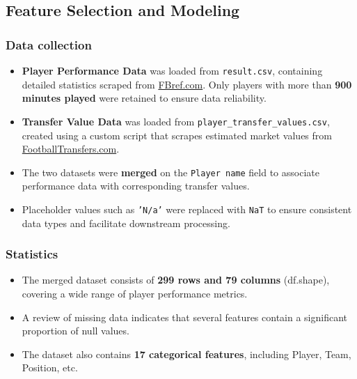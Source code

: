 \documentclass[12pt,a4paper]{report}
\begin{document}
\subsection{Feature Selection and Modeling}
\subsubsection{Data collection}
\begin{itemize}
    \item \textbf{Player Performance Data} was loaded from \texttt{result.csv}, containing detailed statistics scraped from \href{https://fbref.com/en/}{FBref.com}. Only players with more than \textbf{900 minutes played} were retained to ensure data reliability.
    \item \textbf{Transfer Value Data} was loaded from \texttt{player\_transfer\_values.csv}, created using a custom script that scrapes estimated market values from \href{https://footballtransfers.com}{FootballTransfers.com}.
    \item The two datasets were \textbf{merged} on the \texttt{Player name} field to associate performance data with corresponding transfer values.
    \item Placeholder values such as \texttt{'N/a'} were replaced with \texttt{NaT} to ensure consistent data types and facilitate downstream processing.
\end{itemize}

\subsubsection{Statistics}
\begin{itemize}
    \item The merged dataset consists of \textbf{299 rows and 79 columns} (df.shape), covering a wide range of player performance metrics.
    \item A review of missing data indicates that several features contain a significant proportion of null values.
    \item The dataset also contains \textbf{17 categorical features}, including Player, Team, Position, etc.
\end{itemize}
\end{document}
